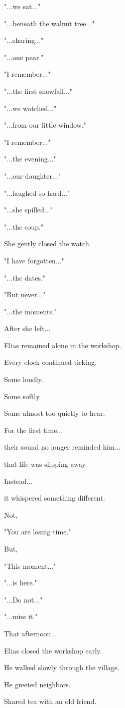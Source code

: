\documentclass[12pt,openany]{book}
\begin{document}
"...we sat..."

"...beneath the walnut tree..."

"...sharing..."

"...one pear."

"I remember..."

"...the first snowfall..."

"...we watched..."

"...from our little window."

"I remember..."

"...the evening..."

"...our daughter..."

"...laughed so hard..."

"...she spilled..."

"...the soup."

She gently closed the watch.

"I have forgotten..."

"...the dates."

"But never..."

"...the moments."

After she left...

Elias remained alone in the workshop.

Every clock continued ticking.

Some loudly.

Some softly.

Some almost too quietly to hear.

For the first time...

their sound no longer reminded him...

that life was slipping away.

Instead...

it whispered something different.

Not,

"You are losing time."

But,

"This moment..."

"...is here."

"...Do not..."

"...miss it."

That afternoon...

Elias closed the workshop early.

He walked slowly through the village.

He greeted neighbors.

Shared tea with an old friend.
\end{document}
